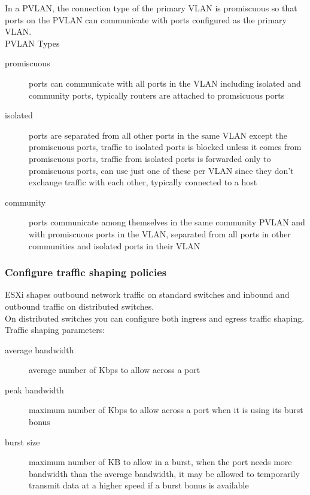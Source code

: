 In a PVLAN, the connection type of the primary VLAN is promiscuous so that
ports on the PVLAN can communicate with ports configured as the primary VLAN.\\

PVLAN Types

\begin{description}

\item[promiscuous]
ports can communicate with all ports in the VLAN including isolated and
community ports, typically routers are attached to promsicuous ports

\item[isolated]
ports are separated from all other ports in the same VLAN except the
promiscuous ports, traffic to isolated ports is blocked unless it comes from
promiscuous ports, traffic from isolated ports is forwarded only to
promiscuous ports, can use just one of these per VLAN since they don't
exchange traffic with each other, typically connected to a host

\item[community]
ports communicate among themselves in the same community PVLAN and with
promiscuous ports in the VLAN, separated from all ports in other communities
and isolated ports in their VLAN

\end{description}

\subsubsection{Configure traffic shaping policies}

ESXi shapes outbound network traffic on standard switches and inbound and
outbound traffic on distributed switches.\\

On distributed switches you can configure both ingress and egress traffic
shaping.\\

Traffic shaping parameters:

\begin{description}

\item[average bandwidth]
average number of Kbps to allow across a port

\item[peak bandwidth]
maximum number of Kbps to allow across a port when it is using its burst bonus

\item[burst size]
maximum number of KB to allow in a burst, when the port needs more bandwidth
than the average bandwidth, it may be allowed to temporarily transmit data at
a higher speed if a burst bonus is available

\end{description}

